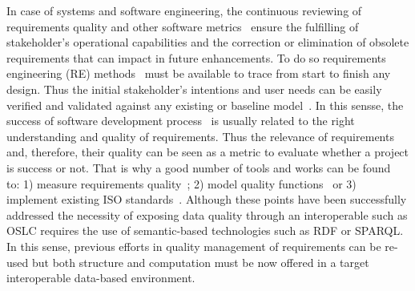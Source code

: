 In case of systems and software engineering, the continuous reviewing of requirements quality and other software 
metrics~\cite{DBLP:journals/sqj/MontagudAI12} ensure the fulfilling of stakeholder's operational capabilities and 
the correction or elimination of obsolete requirements that can impact in future enhancements. To do so requirements 
engineering (RE) methods~\cite{DBLP:journals/is/CastroKM02} must be available to trace from start to finish any design. 
Thus the initial stakeholder's intentions and user needs can be easily verified and validated against any existing or 
baseline model~\cite{DBLP:journals/jss/ZhengAO08}. In this sensse, the success of software development 
process~\cite{DBLP:journals/re/Ralph13} is usually related to the right understanding and quality of requirements. Thus the relevance 
of requirements and, therefore, their quality can be seen as a metric to evaluate whether a project is success or 
not. That is why a good number of tools and works can be found~\cite{DBLP:conf/refsq/2013} to: 1) measure requirements 
quality~\cite{DBLP:journals/re/GenovaFMHM13}; 2) model quality functions~\cite{DBLP:journals/ijseke/SaekiHK13} or 3) implement 
existing ISO standards~\cite{DBLP:journals/sqj/CoteSLM05}. Although these points have been successfully addressed the 
necessity of exposing data quality through an interoperable such as OSLC requires the use of semantic-based 
technologies such as RDF or SPARQL. In this sense, previous efforts in quality management of requirements can 
be re-used but both structure and computation must be now offered in a target interoperable data-based environment.




